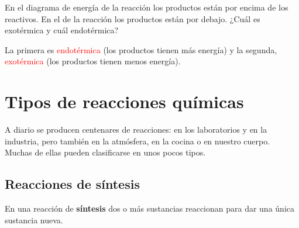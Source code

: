 \begin{exercise}
    En el diagrama de energía de la reacción  los productos están por encima de los reactivos. En el de la reacción  los productos están por debajo. ¿Cuál es exotérmica y cuál endotérmica?
    \begin{solu}
        La primera es \textcolor{red}{endotérmica} (los productos tienen más energía) y la segunda, \textcolor{red}{exotérmica} (los productos tienen menos energía).
    \end{solu}
\end{exercise}

\section{Tipos de reacciones químicas}

A diario se producen centenares de reacciones: en los laboratorios y en la industria, pero también en la atmósfera, en la cocina o en nuestro cuerpo. Muchas de ellas pueden clasificarse en unos pocos tipos.

\subsection{Reacciones de síntesis}

En una reacción de \textbf{síntesis} dos o más sustancias reaccionan para dar una única sustancia nueva.

